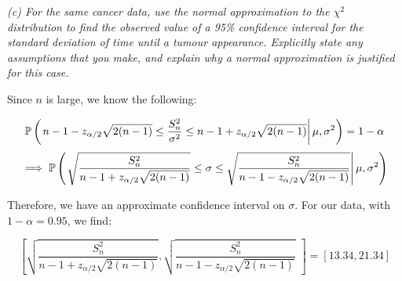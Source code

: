         \textit{(c) For the same cancer data, use the normal approximation
        to the $\chi^2$ distribution to find the observed value of a 95\%
        confidence interval for the standard deviation of time until a
        tumour appearance. Explicitly state any assumptions that you make,
        and explain why a normal approximation is justified for this case.}

            Since $n$ is large, we know the following:

            \[
                \mathbb{P}\left(\left.n - 1 - z_{\alpha/2} \sqrt{2(n-1)} \leq
                \frac{S_n^2}{\sigma^2} \leq n - 1 +
                z_{\alpha/2}\sqrt{2(n-1)} \right|\mu, \sigma^2\right) = 1 -
                \alpha
            \]
            \[
                \implies \mathbb{P}\left(\left.\sqrt{\frac{S_n^2}{n - 1 +
                z_{\alpha/2}\sqrt{2(n-1)}}} \leq \sigma \leq
                \sqrt{\frac{S_n^2}{n - 1 - z_{\alpha/2}\sqrt{2(n-1)}}}
                \right|\mu, \sigma^2\right)
            \]

            Therefore, we have an approximate confidence interval on
            $\sigma$. For our data, with $1 - \alpha = 0.95$, we find:

            \[
                \left[\sqrt{\frac{S_n^2}{n - 1 +
                z_{\alpha/2}\sqrt{2(n-1)}}},
                \sqrt{\frac{S_n^2}{n - 1 - z_{\alpha/2}\sqrt{2(n-1)}}}\,\,
                \right] = [13.34, 21.34]
            \]
